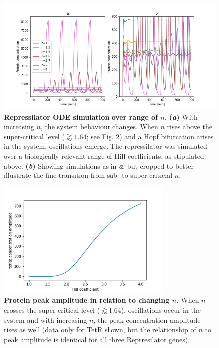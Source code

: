 \documentclass[runningheads,a4paper]{llncs}
\begin{document}
\begin{figure}
    \singlespacing
    \centering
    \includegraphics[width=\textwidth]{suplementary_information_and_code/Task3_figure2.png}
    \caption{\textbf{Repressilator ODE simulation over range of $n$.} \textbf{(\textit{a})} With increasing $n$, the system behaviour changes. When $n$ rises above the super-critical level ($\gtrapprox 1.64$; see Fig. \ref{fig:fig9}) and a Hopf bifurcation arises in the system, oscillations emerge. The repressilator was simulated over a biologically relevant range of Hill coefficients, as stipulated above. \textbf{(\textit{b})} Showing simulations as in \textbf{\textit{a}}, but cropped to better illustrate the fine transition from sub- to super-criticial $n$.}
    \label{fig:fig8}
\end{figure}

\begin{figure}
    \singlespacing
    \centering
    \includegraphics[width=0.75\textwidth]{suplementary_information_and_code/Task3_figure3.png}
    \caption{\textbf{Protein peak amplitude in relation to changing $n$.} When $n$ crosses the super-critical level ($\gtrapprox 1.64$), oscillations occur in the system and with increasing $n$, the peak concentration amplitude rises as well (data only for TetR shown, but the relationship of $n$ to peak amplitude is identical for all three Reprresilator genes).}
    \label{fig:fig9}
\end{figure}
\end{document}
